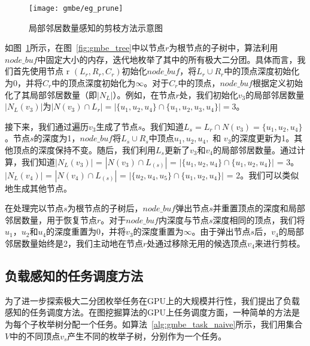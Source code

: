 \begin{figure} [H]
  \center
    \vspace{0.1in}
		\texttt{[image: gmbe/eg\_prune]}
    \vspace{0.1in}
	\caption{局部邻居数量感知的剪枝方法示意图}
	\label{fig:gmbe_prune}
\end{figure}

\begin{example}
  如图~\ref{fig:gmbe_prune}所示，在图~\ref{fig:gmbe_tree}中以节点$r$为根节点的子树中，算法利用$node\_buf$中固定大小的内存，迭代地枚举了其中的所有极大二分团。具体而言，我们首先使用节点 r $(L_r, R_r, C_r)$初始化$node\_buf$，将$L_r \cup R_r$中的顶点深度初始化为0，并将$C_r$中的顶点深度初始化为$\infty$。对于$C_r$中的顶点，$node\_buf$根据定义初始化了其局部邻居数量（即$|N_L|$）。例如，在节点$r$处，我们初始化$v_3$的局部邻居数量$|N_L(v_3)|$为$|N(v_3) \cap L_r| = 
  |\{u_1, u_2, u_4\}\cap \{u_1,u_2,u_3,u_4\}| = 3$。

  接下来，我们通过遍历$v_3$生成了节点$s$。我们知道$L_s=L_r\cap N(v_3)=\{u_1, u_2, u_4\}$。节点$s$的深度为1，$node\_buf$将$L_s\cup R_s$中顶点$u_1, u_2, u_4,$ 和 $v_3$的深度更新为1。其他顶点的深度保持不变。随后，我们利用$L_s$更新了$v_3$和$v_4$的局部邻居数量。通过计算，我们知道$|N_L(v_3)|$ = $|N(v_3) \cap L_{(s)}|$
  = $|\{u_1, u_2, u_4\} \cap \{u_1, u_2, u_4\}|$ = 3。
  $|N_L(v_4)|$ = $|N(v_4) \cap L_{(s)}|$
  = $|\{u_2, u_4, u_5\} \cap \{u_1, u_2, u_4\}|$ = 2。我们可以类似地生成其他节点。

在处理完以节点$s$为根节点的子树后，$node\_buf$弹出节点$s$并重置顶点的深度和局部邻居数量，用于恢复节点$r$。对于$node\_buf$内深度与节点$s$深度相同的顶点，我们将$u_1$，$u_2$和$u_4$的深度重置为0，并将$v_3$的深度重置为$\infty$。由于弹出节点$s$后，$v_4$的局部邻居数量始终是2，我们主动地在节点$r$处通过移除无用的候选顶点$v_4$来进行剪枝。


\end{example}


\subsection{负载感知的任务调度方法}
\label{subsec:gmbe_design_load}

为了进一步探索极大二分团枚举任务在GPU上的大规模并行性，我们提出了负载感知的任务调度方法。在图挖掘算法的GPU上任务调度方面，一种简单的方法是为每个子枚举树分配一个任务。如算法~\ref{alg:gmbe_task_naive}所示，我们用集合$V$中的不同顶点$v_s$产生不同的枚举子树，分别作为一个任务。

